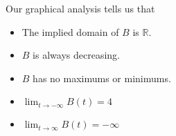 \documentclass{ximera}
\begin{document}
\begin{example}
\begin{image}
\end{image}




Our graphical analysis tells us that 

\begin{itemize}
\item The implied domain of $B$ is $\mathbb{R}$.
\item $B$ is always decreasing.
\item $B$ has no maximums or minimums.
\item $\lim_{t \to -\infty} B(t) = 4$
\item $\lim_{t \to \infty} B(t) = -\infty$
\end{itemize}



\end{example}
\end{document}
